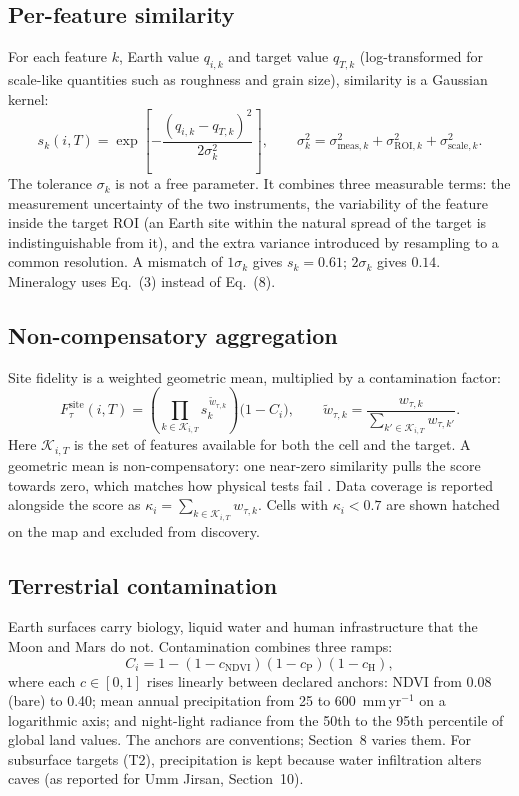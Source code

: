 \documentclass[11pt,a4paper]{article}
\begin{document}
\subsection{Per-feature similarity}
For each feature $k$, Earth value $q_{i,k}$ and target value $q_{T,k}$ (log-transformed for scale-like quantities such as roughness and grain size), similarity is a Gaussian kernel:
\begin{equation*}
s_k(i,T)=\exp\!\left[-\frac{(q_{i,k}-q_{T,k})^2}{2\sigma_k^2}\right], \qquad \sigma_k^2=\sigma^2_{\mathrm{meas},k}+\sigma^2_{\mathrm{ROI},k}+\sigma^2_{\mathrm{scale},k}. \tag{8}
\end{equation*}
The tolerance $\sigma_k$ is not a free parameter. It combines three measurable terms: the measurement uncertainty of the two instruments, the variability of the feature inside the target ROI (an Earth site within the natural spread of the target is indistinguishable from it), and the extra variance introduced by resampling to a common resolution. A mismatch of $1\sigma_k$ gives $s_k=0.61$; $2\sigma_k$ gives $0.14$. Mineralogy uses Eq.~(3) instead of Eq.~(8).

\subsection{Non-compensatory aggregation}
Site fidelity is a weighted geometric mean, multiplied by a contamination factor:
\begin{equation*}
F^{\mathrm{site}}_\tau(i,T)=\left(\prod_{k\in\mathcal{K}_{i,T}} s_k^{\,\tilde w_{\tau,k}}\right)\bigl(1-C_i\bigr), \qquad \tilde w_{\tau,k}=\frac{w_{\tau,k}}{\sum_{k'\in\mathcal{K}_{i,T}} w_{\tau,k'}}. \tag{9}
\end{equation*}
Here $\mathcal{K}_{i,T}$ is the set of features available for both the cell and the target. A geometric mean is non-compensatory: one near-zero similarity pulls the score towards zero, which matches how physical tests fail \citep{oecd2008}. Data coverage is reported alongside the score as $\kappa_i=\sum_{k\in\mathcal{K}_{i,T}} w_{\tau,k}$. Cells with $\kappa_i<0.7$ are shown hatched on the map and excluded from discovery.

\subsection{Terrestrial contamination}
Earth surfaces carry biology, liquid water and human infrastructure that the Moon and Mars do not. Contamination combines three ramps:
\begin{equation*}
C_i = 1-(1-c_{\mathrm{NDVI}})(1-c_{\mathrm{P}})(1-c_{\mathrm{H}}), \tag{10}
\end{equation*}
where each $c\in[0,1]$ rises linearly between declared anchors: NDVI from 0.08 (bare) to 0.40; mean annual precipitation from 25 to 600~mm\,yr$^{-1}$ on a logarithmic axis; and night-light radiance from the 50th to the 95th percentile of global land values. The anchors are conventions; Section~8 varies them. For subsurface targets (T2), precipitation is kept because water infiltration alters caves (as reported for Umm Jirsan, Section~10).
\end{document}

